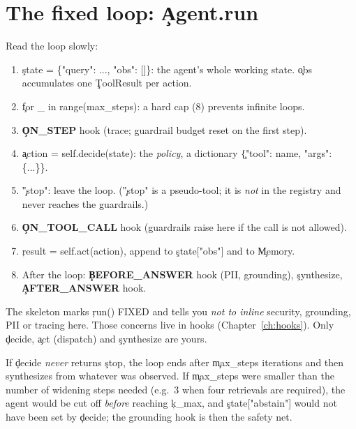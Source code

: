 \section{The fixed loop: \c{Agent.run}}
Read the loop slowly:
\begin{enumerate}
 \item \c{state = \{"query": ..., "obs": []\}}: the agent's whole working state. \c{obs} accumulates one \c{ToolResult} per action.
 \item \c{for \_ in range(max\_steps)}: a hard cap (8) prevents infinite loops.
 \item \textbf{\c{ON\_STEP}} hook (trace; guardrail budget reset on the first step).
 \item \c{action = self.decide(state)}: the \emph{policy}, a dictionary \c{\{"tool": name, "args": \{...\}\}}.
 \item \c{"stop"}: leave the loop. (\c{"stop"} is a pseudo-tool; it is \emph{not} in the registry and never reaches the guardrails.)
 \item \textbf{\c{ON\_TOOL\_CALL}} hook (guardrails raise here if the call is not allowed).
 \item \c{result = self.act(action)}, append to \c{state["obs"]} and to \c{Memory}.
 \item After the loop: \textbf{\c{BEFORE\_ANSWER}} hook (PII, grounding), \c{synthesize}, \textbf{\c{AFTER\_ANSWER}} hook.
\end{enumerate}
\begin{why}
The skeleton marks \c{run()} FIXED and tells you \emph{not to inline} security, grounding, PII or tracing here. Those concerns live in hooks (Chapter~\ref{ch:hooks}). Only \c{decide}, \c{act} (dispatch) and \c{synthesize} are yours.
\end{why}
\begin{gotcha}
If \c{decide} \emph{never} returns \c{stop}, the loop ends after \c{max\_steps} iterations and then synthesizes from whatever was observed. If \c{max\_steps} were smaller than the number of widening steps needed (e.g.\ 3 when four retrievals are required), the agent would be cut off \emph{before} reaching \c{k\_max}, and \c{state["abstain"]} would not have been set by \c{decide}; the grounding hook is then the safety net.
\end{gotcha}

